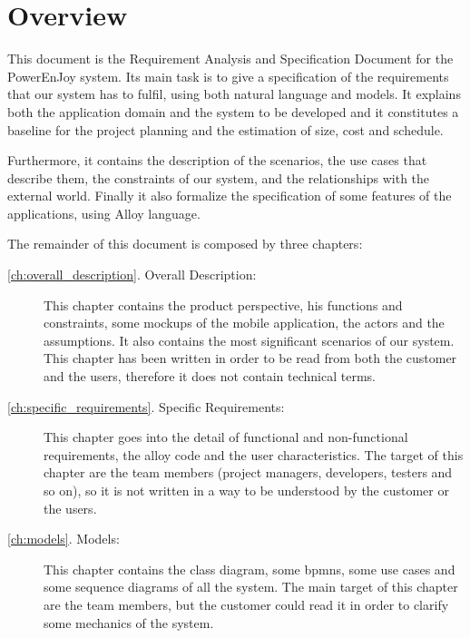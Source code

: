 \section{Overview}
This document is the Requirement Analysis and Specification Document for the PowerEnJoy system.
Its main task is to give a specification of the requirements that our system has to fulfil, using both natural language and models.
It explains both the application domain and the system to be developed and it constitutes a baseline for the project planning and the estimation of size, cost and schedule.

Furthermore, it contains the description of the scenarios, the use cases that describe them, the constraints of our system, and the relationships with the external world. Finally it also formalize the specification of some features of the applications, using Alloy language.

The remainder of this document is composed by three chapters:
\begin{description}
	\item [\autoref{ch:overall_description}. Overall Description:] This chapter contains the product perspective, his functions and constraints, some mockups of the mobile application, the actors and the assumptions. It also contains the most significant scenarios of our system.
	This chapter has been written in order to be read from both the customer and the users, therefore it does not contain technical terms.
	\item [\autoref{ch:specific_requirements}. Specific Requirements:] This chapter goes into the detail of functional and non-functional requirements, the alloy code and the user characteristics.
	The target of this chapter are the team members (project managers, developers, testers and so on), so it is not written in a way to be understood by the customer or the users.
	\item [\autoref{ch:models}. Models:] This chapter contains the class diagram, some bpmns, some use cases and some sequence diagrams of all the system.
	The main target of this chapter are the team members, but the customer could read it in order to clarify some mechanics of the system.
\end{description}
